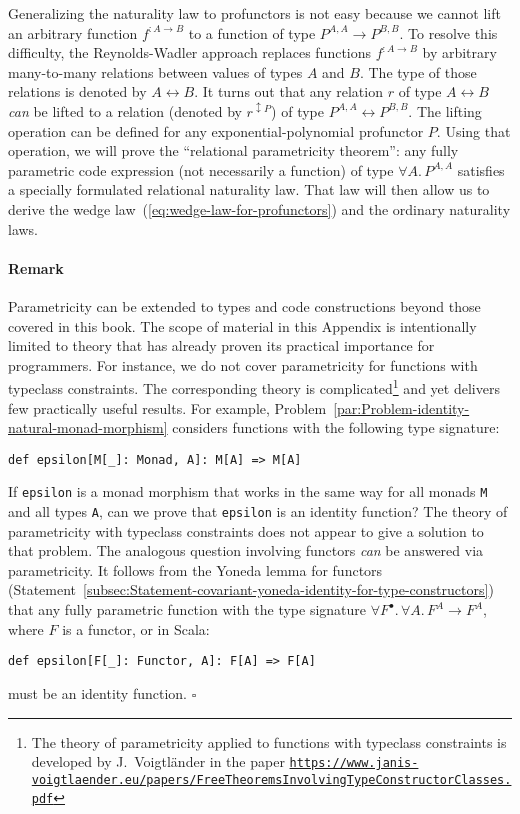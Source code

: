 Generalizing the naturality law to profunctors is not easy because
we cannot lift an arbitrary function $f^{:A\rightarrow B}$ to a function
of type $P^{A,A}\rightarrow P^{B,B}$. To resolve this difficulty,
the Reynolds-Wadler approach replaces functions $f^{:A\rightarrow B}$
by arbitrary many-to-many relations between values of types $A$ and
$B$. The type of those relations is denoted by $A\leftrightarrow B$.
It turns out that any relation $r$ of type $A\leftrightarrow B$
\emph{can} be lifted to a relation (denoted by $r^{\updownarrow P}$)
of type $P^{A,A}\leftrightarrow P^{B,B}$. The lifting operation can
be defined for any exponential-polynomial profunctor $P$. Using that
operation, we will prove the \textsf{``}relational parametricity theorem\textsf{''}:
any fully parametric code expression (not necessarily a function)
of type $\forall A.\,P^{A,A}$ satisfies a specially formulated relational
naturality law. That law will then allow us to derive the wedge law~(\ref{eq:wedge-law-for-profunctors})
and the ordinary naturality laws.

\paragraph{Remark}

Parametricity can be extended to types and code constructions beyond
those covered in this book. The scope of material in this Appendix
is intentionally limited to theory that has already proven its practical
importance for programmers. For instance, we do not cover parametricity
for functions with typeclass constraints. The corresponding theory
is complicated\footnote{The theory of parametricity applied to functions with typeclass constraints
is developed by J.~Voigtl\"ander
in the paper \texttt{\href{https://www.janis-voigtlaender.eu/papers/FreeTheoremsInvolvingTypeConstructorClasses.pdf}{https://www.janis-voigtlaender.eu/papers/FreeTheoremsInvolvingTypeConstructorClasses.pdf}}} and yet delivers few practically useful results. For example, Problem~\ref{par:Problem-identity-natural-monad-morphism}
considers functions with the following type signature:
\begin{lstlisting}
def epsilon[M[_]: Monad, A]: M[A] => M[A]
\end{lstlisting}
If \lstinline!epsilon! is a monad morphism that works in the same
way for all monads \lstinline!M! and all types \lstinline!A!, can
we prove that \lstinline!epsilon! is an identity function? The theory
of parametricity with typeclass constraints does not appear to give
a solution to that problem. The analogous question involving functors
\emph{can} be answered via parametricity. It follows from the Yoneda
lemma for functors (Statement~\ref{subsec:Statement-covariant-yoneda-identity-for-type-constructors})
that any fully parametric function with the type signature $\forall F^{\bullet}.\,\forall A.\,F^{A}\rightarrow F^{A}$,
where $F$ is a functor, or in Scala:
\begin{lstlisting}
def epsilon[F[_]: Functor, A]: F[A] => F[A]
\end{lstlisting}
must be an identity function. $\square$

